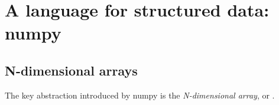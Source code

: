 \documentclass[thesis]{subfiles}
\begin{document}
%
%
%
%
%


\section{A language for structured data: numpy}


\subsection{N-dimensional arrays}

The key abstraction introduced by numpy is the \textit{N-dimensional array}, or .


\end{document}
